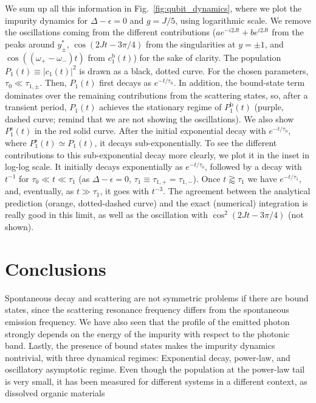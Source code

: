 \documentclass[aps,pra,twocolumn,floatfix,superscriptaddress]{revtex4-1}%
\begin{document}
{\color{blue}We sum up all this information in Fig.\ \ref{fig:qubit_dynamics}, where we plot the impurity dynamics for $\Delta-\epsilon=0$ and $g=J/5$, using logarithmic scale. 
We remove the oscillations coming from the different contributions ($ae^{-i2Jt}+be^{i2Jt}$ from the peaks around $y_\pm^*$, $\cos(2Jt-3\pi/4)$ from the singularities at $y=\pm 1$, and $\cos((\omega_+-\omega_-)t)$ from $c_1^\text{b}(t)$) for the sake of clarity. The population $P_1(t)\equiv|c_1(t)|^2$ is drawn as a black, dotted curve. For the chosen parameters, $\tau_0\ll \tau_{1,\pm}$. Then, $P_1(t)$ first decays as $e^{-t/\tau_0}$. In addition, the bound-state term dominates over the remaining contributions from the scattering states, so, after a transient period, $P_1(t)$ achieves the stationary regime of $P_1^\text{b}(t)$ (purple, dashed curve; remind that we are not showing the oscillations). We also show $P_1^\text{s}(t)$ in the red solid curve. After the initial exponential decay with $e^{-t/\tau_0}$, where $P_1^\text{s}(t)\simeq P_1(t)$, it decays sub-exponentially. To see the different contributions to this sub-exponential decay more clearly, we plot it in the inset in log-log scale. It initially decays exponentially as $e^{-t/\tau_0}$, followed by a decay with $t^{-1}$ for $\tau_0\ll t\ll \tau_1$ (as $\Delta-\epsilon=0$, $\tau_1\equiv\tau_{1,+}=\tau_{1,-}$). Once $t\gtrapprox \tau_1$ we have $e^{-t/\tau_1}$, and, eventually, as $t\gg\tau_1$, it goes with $t^{-3}$. The agreement between the analytical prediction (orange, dotted-dashed curve) and the exact (numerical) integration is really good in this limit, as well as the oscillation with $\cos^2(2Jt-3\pi/4)$ (not shown).}

\section{Conclusions}\label{sec:conclusions}

{\color{blue}Spontaneous decay and scattering are not symmetric problems if there are bound states, since the scattering resonance frequency differs from the spontaneous emission frequency. We have also seen that the profile of the emitted photon strongly depends on the energy of the impurity with respect to the photonic band. Lastly, the presence of bound states makes the impurity dynamics nontrivial, with three dynamical regimes: Exponential decay, power-law, and oscillatory asymptotic regime. Even though the population at the power-law tail is very small, it has been measured for different systems in a different context, as dissolved organic materials \cite{Rothe2006}}
\end{document}

